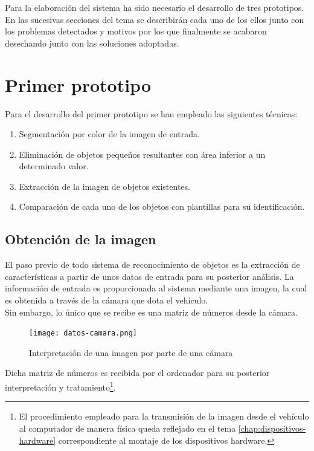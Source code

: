 Para la elaboración del sistema ha sido necesario el desarrollo de tres prototipos. En las sucesivas secciones del tema se describirán cada uno de los ellos junto con los problemas detectados y motivos por los que finalmente se acabaron desechando junto con las soluciones adoptadas.

\section {Primer prototipo}

Para el desarrollo del primer prototipo se han empleado las siguientes técnicas:

\begin{enumerate}
\item Segmentación por color de la imagen de entrada.
\item Eliminación de objetos pequeños resultantes con área inferior a un determinado valor.
\item Extracción de la imagen de objetos existentes.
\item Comparación de cada uno de los objetos con plantillas para su identificación.
\end{enumerate}

\subsection{Obtención de la imagen}

El paso previo de todo sistema de reconocimiento de objetos es la extracción de características a partir de unos datos de entrada para su posterior análisis. La información de entrada es proporcionada al sistema mediante una imagen, la cual es obtenida a través de la cámara que dota el vehículo.\\

Sin embargo, lo único que se recibe es una matriz de números desde la cámara.\\

\begin{figure}[H]
  \begin{center}
    \texttt{[image: datos-camara.png]}
  \end{center}
  \caption{Interpretación de una imagen por parte de una cámara}
  \label{imagen-entrada-rp}
\end{figure}

Dicha matriz de números es recibida por el ordenador para su posterior interpretación y tratamiento\footnote{El procedimiento empleado para la transmisión de la imagen desde el vehículo al computador de manera física queda reflejado en el tema \ref{chap:dispositivos-hardware} correspondiente al montaje de los dispositivos hardware.}. \\

